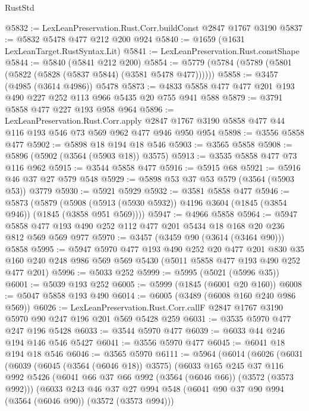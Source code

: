 \begin{lexlean}{RustStd}
\begin{coremodule}
@5832 := LexLeanPreservation.Rust.Corr.buildConst @2847 @1767 @3190
@5837 := @5832 @5478 @477 @212 @200 @924
@5840 := @1659 (@1631 LexLeanTarget.RustSyntax.Lit)
@5841 := LexLeanPreservation.Rust.constShape
@5844 := @5840 (@5841 @212 @200)
@5854 := @5779 (@5784 (@5789 (@5801 (@5822 (@5828 (@5837 @5844) (@3581 @5478 @477))))))
@5858 := @3457 (@4985 (@3614 @4986)) @5478
@5873 := @4833 @5858 @477 @477 @201 @193 @490 @227 @252 @113 @966 @5435 @20 @755 @941 @588
@5879 := @3791 @5858 @477 @227 @193 @958 @964
@5896 := LexLeanPreservation.Rust.Corr.apply
    @2847
    @1767
    @3190
    @5858
    @477
    @44
    @116
    @193
    @546
    @73
    @569
    @962
    @477
    @946
    @950
    @954
@5898 := @3556 @5858 @477
@5902 := @5898 @18 @194 @18 @546
@5903 := @3565 @5858
@5908 := @5896 (@5902 (@3564 (@5903 @18)) @3575)
@5913 := @3535 @5858 @477 @73 @116 @962
@5915 := @3544 @5858 @477
@5916 := @5915 @68
@5921 := @5916 @46 @37 @27 @579 @548
@5929 := @5898 @53 @37 @53 @579 (@3564 (@5903 @53)) @3779
@5930 := @5921 @5929
@5932 := @3581 @5858 @477
@5946 := @5873
    (@5879 (@5908 (@5913 (@5930 @5932)) @4196 @3604 (@1845 (@3854 @946)) (@1845 (@3858 @951 @569))))
@5947 := @4966 @5858
@5964 := @5947 @5858 @477 @193 @490 @252 @112 @477 @201 @5434 @18 @168 @20 @236 @812 @569 @569 @977
@5970 := @3457 (@3459 @90 (@3614 (@3464 @90))) @5858
@5995 := @5947
    @5970
    @477
    @193
    @490
    @252
    @20
    @477
    @201
    @830
    @35
    @160
    @240
    @248
    @986
    @569
    @569
    @5430
    (@5011 @5858 @477 @193 @490 @252 @477 @201)
@5996 := @5033 @252
@5999 := @5995 (@5021 (@5996 @35))
@6001 := @5039 @193 @252
@6005 := @5999 (@1845 (@6001 @20 @160))
@6008 := @5047 @5858 @193 @490
@6014 := @6005 (@3489 (@6008 @160 @240 @986 @569))
@6026 := LexLeanPreservation.Rust.Corr.callF
    @2847
    @1767
    @3190
    @5970
    @90
    @247
    @196
    @201
    @569
    @5428
    @259
@6031 := @3535 @5970 @477 @247 @196 @5428
@6033 := @3544 @5970 @477
@6039 := @6033 @44 @246 @194 @146 @546 @5427
@6041 := @3556 @5970 @477
@6045 := @6041 @18 @194 @18 @546
@6046 := @3565 @5970
@6111 := @5964
    (@6014
      (@6026
        (@6031
          (@6039
            (@6045 (@3564 (@6046 @18)) @3575)
            (@6033
              @165
              @245
              @37
              @116
              @992
              @5426
              (@6041 @66 @37 @66 @992 (@3564 (@6046 @66)) (@3572 (@3573 @992)))
              (@6033
                @243
                @46
                @37
                @27
                @994
                @548
                (@6041 @90 @37 @90 @994 (@3564 (@6046 @90)) (@3572 (@3573 @994)))

\end{coremodule}
\end{lexlean}
